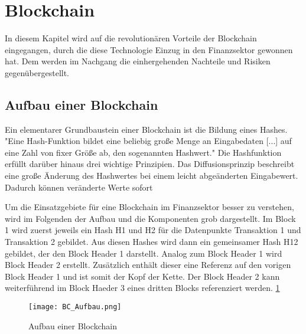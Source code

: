 \section{Blockchain}
In diesem Kapitel wird auf die revolutionären Vorteile der Blockchain 
eingegangen, durch die diese Technologie Einzug in den Finanzsektor gewonnen 
hat. Dem werden im Nachgang die einhergehenden Nachteile und Risiken gegenübergestellt. 

\subsection{Aufbau einer Blockchain}
Ein elementarer Grundbaustein einer Blockchain ist die Bildung eines Hashes.
"Eine Hash-Funktion bildet eine beliebig große Menge an Eingabedaten [...] auf eine Zahl von 
fixer Größe ab, den sogenannten Hashwert." \cite[p.~6]{fill2020blockchain}
Die Hashfunktion erfüllt darüber hinaus drei wichtige Prinzipien.
Das Diffusionsprinzip beschreibt eine große Änderung des Hashwertes bei einem leicht
abgeänderten Eingabewert. Dadurch können veränderte Werte sofort 
\cite[p.~6ff]{fill2020blockchain}

Um die Einsatzgebiete für eine Blockchain im Finanzsektor besser zu verstehen,
wird im Folgenden der Aufbau und die Komponenten grob dargestellt.
Im Block 1 wird zuerst jeweils ein Hash H1 und H2 für die Datenpunkte Transaktion 1 
und Transaktion 2 gebildet. Aus diesen Hashes wird dann ein gemeinsamer Hash H12 gebildet, 
der den Block Header 1 darstellt.
Analog zum Block Header 1 wird Block Header 2 erstellt. Zusätzlich enthält dieser eine
Referenz auf den vorigen Block Header 1 und ist somit der Kopf der Kette. Der Block Header 2
kann weiterführend im Block Haeder 3 eines dritten Blocks referenziert werden. 
\ref{fig:BC_Aufbau}
\cite[p.~17f]{fill2020blockchain}

\begin{figure}[h] %
    \texttt{[image: BC\_Aufbau.png]}
    \caption{Aufbau einer Blockchain}
    \label{fig:BC_Aufbau}
\end{figure}


\subsection{}